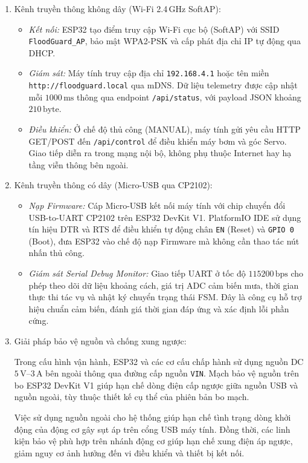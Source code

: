 \begin{enumerate}
    \item Kênh truyền thông không dây (Wi-Fi 2.4\,GHz SoftAP):
    \begin{itemize}
        \item \textit{Kết nối:} ESP32 tạo điểm truy cập Wi-Fi cục bộ (SoftAP) với SSID \newline \texttt{FloodGuard\_AP}, bảo mật WPA2-PSK và cấp phát địa chỉ IP tự động qua DHCP.
        \item \textit{Giám sát:} Máy tính truy cập địa chỉ \texttt{192.168.4.1} hoặc tên miền \newline \texttt{http://floodguard.local} qua mDNS. Dữ liệu telemetry được cập nhật mỗi $1000\,\text{ms}$ thông qua endpoint \texttt{/api/status}, với payload JSON khoảng $210\,\text{byte}$.
        \item \textit{Điều khiển:} Ở chế độ thủ công (MANUAL), máy tính gửi yêu cầu HTTP GET/POST đến \texttt{/api/control} để điều khiển máy bơm và góc Servo. Giao tiếp diễn ra trong mạng nội bộ, không phụ thuộc Internet hay hạ tầng viễn thông bên ngoài.
    \end{itemize}

    \item Kênh truyền thông có dây (Micro-USB qua CP2102):
    \begin{itemize}
        \item \textit{Nạp Firmware:} Cáp Micro-USB kết nối máy tính với chip chuyển đổi USB-to-UART CP2102 trên ESP32 DevKit V1. PlatformIO IDE sử dụng tín hiệu DTR và RTS để điều khiển tự động chân \texttt{EN} (Reset) và \texttt{GPIO 0} (Boot), đưa ESP32 vào chế độ nạp Firmware mà không cần thao tác nút nhấn thủ công.
        \item \textit{Giám sát Serial Debug Monitor:} Giao tiếp UART ở tốc độ $115200\,\text{bps}$ cho phép theo dõi dữ liệu khoảng cách, giá trị ADC cảm biến mưa, thời gian thực thi tác vụ và nhật ký chuyển trạng thái FSM. Đây là công cụ hỗ trợ hiệu chuẩn cảm biến, đánh giá thời gian đáp ứng và xác định lỗi phần cứng.
    \end{itemize}

    \item Giải pháp bảo vệ nguồn và chống xung ngược:
    
    Trong cấu hình vận hành, ESP32 và các cơ cấu chấp hành sử dụng nguồn DC $5\,\text{V}$--$3\,\text{A}$ bên ngoài thông qua đường cấp nguồn \texttt{VIN}. Mạch bảo vệ nguồn trên bo ESP32 DevKit V1 giúp hạn chế dòng điện cấp ngược giữa nguồn USB và nguồn ngoài, tùy thuộc thiết kế cụ thể của phiên bản bo mạch.

    Việc sử dụng nguồn ngoài cho hệ thống giúp hạn chế tình trạng dòng khởi động của động cơ gây sụt áp trên cổng USB máy tính. Đồng thời, các linh kiện bảo vệ phù hợp trên nhánh động cơ giúp hạn chế xung điện áp ngược, giảm nguy cơ ảnh hưởng đến vi điều khiển và thiết bị kết nối.
\end{enumerate}
